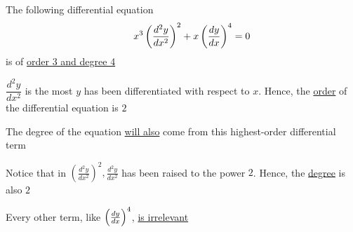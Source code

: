 \documentclass[14pt,fleqn]{extarticle}
\newcommand\expa{ \left(\frac{d^2 y}{dx^2} \right)^2}
\newcommand\expb{ \left(\dydx \right)^4 }
\begin{document}
 
\begin{snippet}
    
    \incorrect
    
    The following differential equation 
    \[ \qquad x^3 \expa + x\expb = 0 \]
    is of \underline{order 3 and degree 4}
    
    \reason
    
    $\dfrac{d^2y}{dx^2}$ is the most $y$ has been differentiated with respect to $x$. Hence, the \underline{order} of the differential equation is $2$ \newline 
    
    The degree of the equation \underline{will also} come from this highest-order 
    differential term \newline 
    
    Notice that in $\expa, \frac{d^2 y}{dx^2}$ has been raised to the power $2$. Hence, the \underline{degree} is also $2$ \newline 
    
    Every other term, like $\expb$, \underline{is irrelevant}
\end{snippet} 
\end{document}
